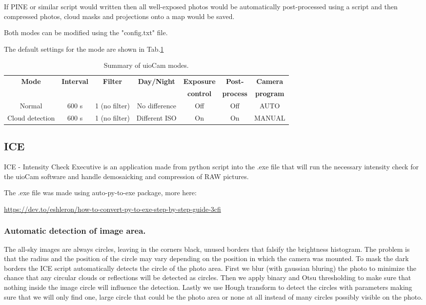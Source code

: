 \documentclass[]{book}
\begin{document}
		If PINE or similar script would written then all well-exposed photos would be automatically post-processed using a script and then compressed photos, cloud masks and projections onto a map would be saved.
		
		Both modes can be modified using the "config.txt" file.
		
		The default settings for the mode are shown in Tab.\ref{tab: modes}
		
		\begin{table}
			\caption{Summary of uioCam modes.}
			\label{tab: modes}
			\begin{tabular}{ |c|c|c|c|c|c|c| } \hline
				\textbf{Mode} & \textbf{Interval} & \textbf{Filter} & \textbf{Day/Night} & \textbf{Exposure} & \textbf{Post-} & \textbf{Camera} \\
				 &  &  &  & \textbf{control} & \textbf{process} & \textbf{program} \\ \hline
				Normal & 600 s & 1 (no filter) & No difference & Off & Off & AUTO \\ \hline
				Cloud detection & 600 s & 1 (no filter) & Different ISO & On & On & MANUAL \\ \hline
			\end{tabular}
		\end{table}
	
	\subsection{ICE} \label{ICE}
	
	ICE - Intensity Check Executive is an application made from python script into the .exe file that will run the necessary intensity check for the uioCam software and handle demosaicking and compression of RAW pictures.
	
	The .exe file was made using auto-py-to-exe package, more here:
	
	\url{https://dev.to/eshleron/how-to-convert-py-to-exe-step-by-step-guide-3cfi}
	
		\subsubsection{Automatic detection of image area.}
		
		The all-sky images are always circles, leaving in the corners black, unused borders that falsify the brightness histogram. The problem is that the radius and the position of the circle may vary depending on the position in which the camera was mounted. To mask the dark borders the ICE script automatically detects the circle of the photo area. First we blur (with gaussian bluring) the photo to minimize the chance that any circular clouds or reflections will be detected as circles. Then we apply binary and Otsu thresholding to make sure that nothing inside the image circle will influence the detection. Lastly we use Hough transform to detect the circles with parameters making sure that we will only find one, large circle that could be the photo area or none at all instead of many circles possibly visible on the photo.
		
\end{document}
